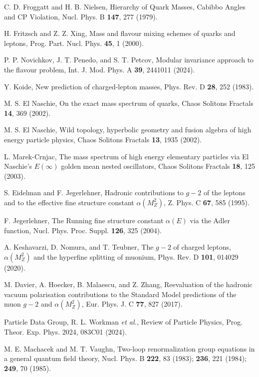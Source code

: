 \documentclass[%
amsmath,amssymb,
aps,
prb,
floatfix,
twocolumn
]{revtex4-2}
\begin{document}
\begin{thebibliography}{99}
C. D. Froggatt and H. B. Nielsen, 
Hierarchy of Quark Masses, Cabibbo Angles and CP Violation, 
Nucl. Phys. B \textbf{147}, 277 (1979).

H. Fritzsch and Z. Z. Xing, 
Mass and flavour mixing schemes of quarks and leptons, 
Prog. Part. Nucl. Phys. \textbf{45}, 1 (2000).

P. P. Novichkov, J. T. Penedo, and S. T. Petcov, 
Modular invariance approach to the flavour problem, 
Int. J. Mod. Phys. A \textbf{39}, 2441011 (2024).

Y. Koide, 
New prediction of charged-lepton masses, 
Phys. Rev. D \textbf{28}, 252 (1983).

M. S. El Naschie, 
On the exact mass spectrum of quarks, 
Chaos Solitons Fractals \textbf{14}, 369 (2002).

M. S. El Naschie, 
Wild topology, hyperbolic geometry and fusion algebra of high energy particle physics, 
Chaos Solitons Fractals \textbf{13}, 1935 (2002).

L. Marek-Crnjac, 
The mass spectrum of high energy elementary particles via El Naschie's $E(\infty)$ golden mean nested oscillators, 
Chaos Solitons Fractals \textbf{18}, 125 (2003).

S. Eidelman and F. Jegerlehner, 
Hadronic contributions to $g-2$ of the leptons and to the effective fine structure constant $\alpha(M_Z^2)$, 
Z. Phys. C \textbf{67}, 585 (1995).

F. Jegerlehner, 
The Running fine structure constant $\alpha(E)$ via the Adler function, 
Nucl. Phys. Proc. Suppl. \textbf{126}, 325 (2004).

A. Keshavarzi, D. Nomura, and T. Teubner, 
The $g-2$ of charged leptons, $\alpha(M_Z^2)$ and the hyperfine splitting of muonium, 
Phys. Rev. D \textbf{101}, 014029 (2020).

M. Davier, A. Hoecker, B. Malaescu, and Z. Zhang, 
Reevaluation of the hadronic vacuum polarisation contributions to the Standard Model predictions of the muon $g-2$ and $\alpha(M_Z^2)$, 
Eur. Phys. J. C \textbf{77}, 827 (2017).

Particle Data Group, R. L. Workman \textit{et al.}, 
Review of Particle Physics, 
Prog. Theor. Exp. Phys. 2024, 083C01 (2024).

M. E. Machacek and M. T. Vaughn, 
Two-loop renormalization group equations in a general quantum field theory, 
Nucl. Phys. B \textbf{222}, 83 (1983); \textbf{236}, 221 (1984); \textbf{249}, 70 (1985).


\end{thebibliography}
\end{document}
